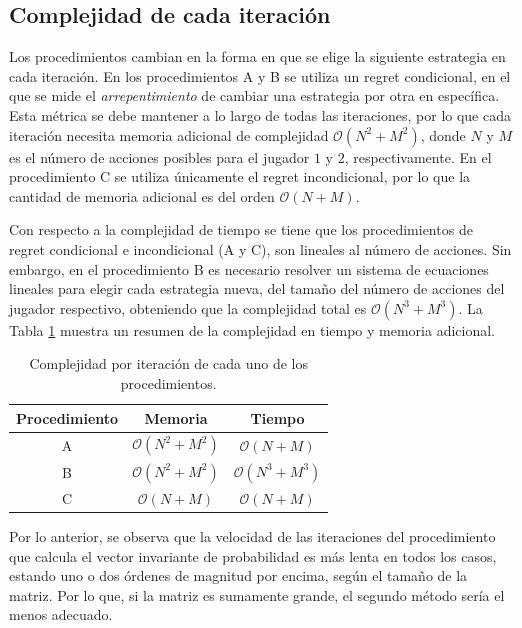 \subsection{Complejidad de cada iteración}

Los procedimientos cambian en la forma en que se elige la siguiente estrategia en cada iteración. En los procedimientos A y B se utiliza un regret condicional, en el que se mide el \textit{arrepentimiento} de cambiar una estrategia por otra en específica. Esta métrica se debe mantener a lo largo de todas las iteraciones, por lo que cada iteración necesita memoria adicional de complejidad $\mathcal{O}(N^2 + M^2)$, donde $N$ y $M$ es el número de acciones posibles para el jugador $1$ y $2$, respectivamente. En el procedimiento C se utiliza únicamente el regret incondicional, por lo que la cantidad de memoria adicional es del orden $\mathcal{O}(N + M)$.

Con respecto a la complejidad de tiempo se tiene que los procedimientos de regret condicional e incondicional (A y C), son lineales al número de acciones. Sin embargo, en el procedimiento B es necesario resolver un sistema de ecuaciones lineales para elegir cada estrategia nueva, del tamaño del número de acciones del jugador respectivo, obteniendo que la complejidad total es $\mathcal{O}(N^3 + M^3)$. La Tabla \ref{tab:complejidades-iteraciones} muestra un resumen de la complejidad en tiempo y memoria adicional.

\begin{table}[h]
    \caption{Complejidad por iteración de cada uno de los procedimientos.}
    \label{tab:complejidades-iteraciones}
    \centering
    \begin{tabular}{c c c}
        \toprule
         Procedimiento & Memoria & Tiempo  \\ \midrule
         A & $\mathcal{O}(N^2 + M^2)$ & $\mathcal{O}(N + M)$ \\ 
         B & $\mathcal{O}(N^2 + M^2)$ & $\mathcal{O}(N^3 + M^3)$ \\
         C & $\mathcal{O}(N + M)$     & $\mathcal{O}(N + M)$ \\ \bottomrule
    \end{tabular}
\end{table}

Por lo anterior, se observa que la velocidad de las iteraciones del procedimiento que calcula el vector invariante de probabilidad es más lenta en todos los casos, estando uno o dos órdenes de magnitud por encima, según el tamaño de la matriz. Por lo que, si la matriz es sumamente grande, el segundo método sería el menos adecuado.

